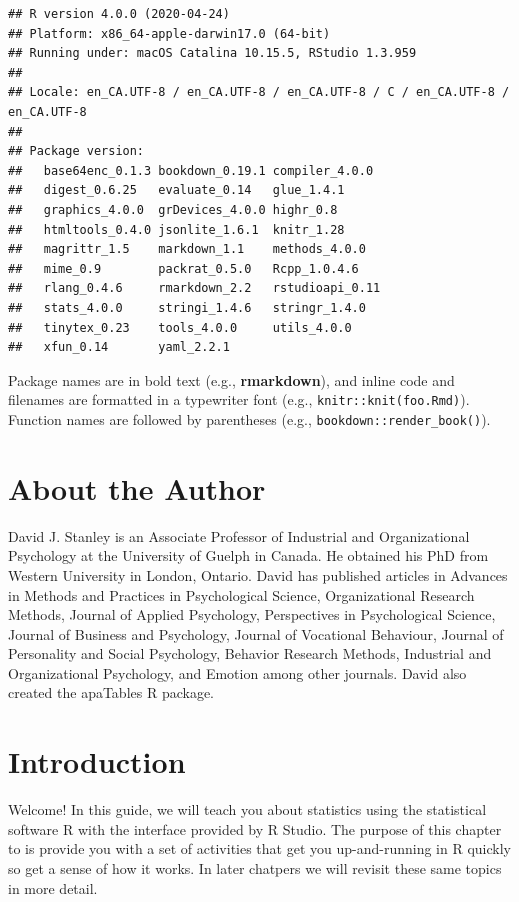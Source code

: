 \documentclass[
]{krantz}
\begin{document}
\begin{verbatim}
## R version 4.0.0 (2020-04-24)
## Platform: x86_64-apple-darwin17.0 (64-bit)
## Running under: macOS Catalina 10.15.5, RStudio 1.3.959
## 
## Locale: en_CA.UTF-8 / en_CA.UTF-8 / en_CA.UTF-8 / C / en_CA.UTF-8 / en_CA.UTF-8
## 
## Package version:
##   base64enc_0.1.3 bookdown_0.19.1 compiler_4.0.0 
##   digest_0.6.25   evaluate_0.14   glue_1.4.1     
##   graphics_4.0.0  grDevices_4.0.0 highr_0.8      
##   htmltools_0.4.0 jsonlite_1.6.1  knitr_1.28     
##   magrittr_1.5    markdown_1.1    methods_4.0.0  
##   mime_0.9        packrat_0.5.0   Rcpp_1.0.4.6   
##   rlang_0.4.6     rmarkdown_2.2   rstudioapi_0.11
##   stats_4.0.0     stringi_1.4.6   stringr_1.4.0  
##   tinytex_0.23    tools_4.0.0     utils_4.0.0    
##   xfun_0.14       yaml_2.2.1
\end{verbatim}

Package names are in bold text (e.g., \textbf{rmarkdown}), and inline code and filenames are formatted in a typewriter font (e.g., \texttt{knitr::knit(\textquotesingle{}foo.Rmd\textquotesingle{})}). Function names are followed by parentheses (e.g., \texttt{bookdown::render\_book()}).

\hypertarget{about-the-author}{%
\chapter*{About the Author}\label{about-the-author}}


David J. Stanley is an Associate Professor of Industrial and Organizational Psychology at the University of Guelph in Canada. He obtained his PhD from Western University in London, Ontario. David has published articles in Advances in Methods and Practices in Psychological Science, Organizational Research Methods, Journal of Applied Psychology, Perspectives in Psychological Science, Journal of Business and Psychology, Journal of Vocational Behaviour, Journal of Personality and Social Psychology, Behavior Research Methods, Industrial and Organizational Psychology, and Emotion among other journals. David also created the apaTables R package.

\mainmatter

\hypertarget{introduction}{%
\chapter{Introduction}\label{introduction}}

Welcome! In this guide, we will teach you about statistics using the statistical software R with the interface provided by R Studio. The purpose of this chapter to is provide you with a set of activities that get you up-and-running in R quickly so get a sense of how it works. In later chatpers we will revisit these same topics in more detail.
\end{document}
